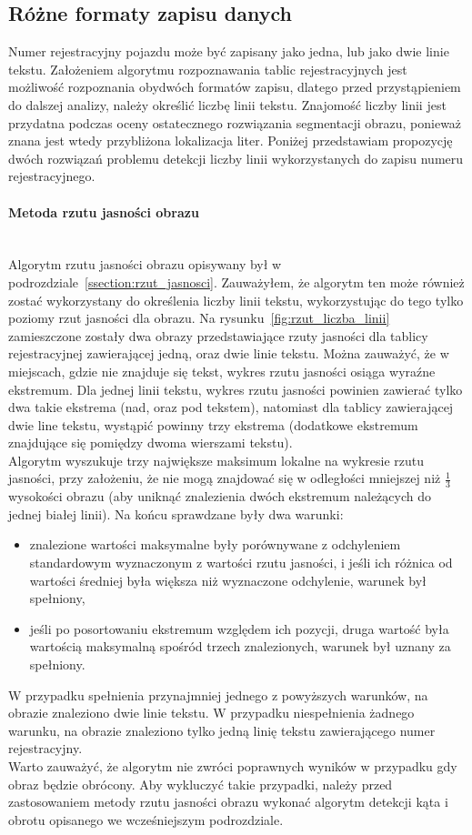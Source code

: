 \subsection{Różne formaty zapisu danych}
Numer rejestracyjny pojazdu może być zapisany jako jedna, lub jako dwie linie tekstu. Założeniem algorytmu rozpoznawania tablic rejestracyjnych jest możliwość rozpoznania obydwóch formatów zapisu, dlatego przed przystąpieniem do dalszej analizy, należy określić liczbę linii tekstu. Znajomość liczby linii jest przydatna podczas oceny ostatecznego rozwiązania segmentacji obrazu, ponieważ znana jest wtedy przybliżona lokalizacja liter. Poniżej przedstawiam propozycję dwóch rozwiązań problemu detekcji liczby linii wykorzystanych do zapisu numeru rejestracyjnego.
\paragraph{Metoda rzutu jasności obrazu}\mbox{}\\
Algorytm rzutu jasności obrazu opisywany był w podrozdziale~\ref{ssection:rzut_jasnosci}. Zauważyłem, że algorytm ten może również zostać wykorzystany do określenia liczby linii tekstu, wykorzystując do tego tylko poziomy rzut jasności dla obrazu. Na rysunku~\ref{fig:rzut_liczba_linii} zamieszczone zostały dwa obrazy przedstawiające rzuty jasności dla tablicy rejestracyjnej zawierającej jedną, oraz dwie linie tekstu. Można zauważyć, że w miejscach, gdzie nie znajduje się tekst, wykres rzutu jasności osiąga wyraźne ekstremum. Dla jednej linii tekstu, wykres rzutu jasności powinien zawierać tylko dwa takie ekstrema (nad, oraz pod tekstem), natomiast dla tablicy zawierającej dwie line tekstu, wystąpić powinny trzy ekstrema (dodatkowe ekstremum znajdujące się pomiędzy dwoma wierszami tekstu).\\
Algorytm wyszukuje trzy największe maksimum lokalne na wykresie rzutu jasności, przy założeniu, że nie mogą znajdować się w odległości mniejszej niż $\frac{1}{3}$ wysokości obrazu (aby uniknąć znalezienia dwóch ekstremum należących do jednej białej linii). Na końcu sprawdzane były dwa warunki:
\begin{itemize}
  \item znalezione wartości maksymalne były porównywane z odchyleniem standardowym wyznaczonym z wartości rzutu jasności, i jeśli ich różnica od wartości średniej była większa niż wyznaczone odchylenie, warunek był spełniony,
  \item jeśli po posortowaniu ekstremum względem ich pozycji, druga wartość była wartością maksymalną spośród trzech znalezionych, warunek był uznany za spełniony.
\end{itemize}
W przypadku spełnienia przynajmniej jednego z powyższych warunków, na obrazie znaleziono dwie linie tekstu. W przypadku niespełnienia żadnego warunku, na obrazie znaleziono tylko jedną linię tekstu zawierającego numer rejestracyjny. \\
Warto zauważyć, że algorytm nie zwróci poprawnych wyników w przypadku gdy obraz będzie obrócony. Aby wykluczyć takie przypadki, należy przed zastosowaniem metody rzutu jasności obrazu wykonać algorytm detekcji kąta i obrotu opisanego we wcześniejszym podrozdziale.



